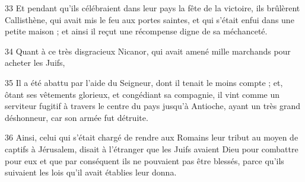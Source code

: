 \par 33 Et pendant qu'ils célébraient dans leur pays la fête de la victoire, ils brûlèrent Callisthène, qui avait mis le feu aux portes saintes, et qui s'était enfui dans une petite maison ; et ainsi il reçut une récompense digne de sa méchanceté.
\par 34 Quant à ce très disgracieux Nicanor, qui avait amené mille marchands pour acheter les Juifs,
\par 35 Il a été abattu par l'aide du Seigneur, dont il tenait le moins compte ; et, ôtant ses vêtements glorieux, et congédiant sa compagnie, il vint comme un serviteur fugitif à travers le centre du pays jusqu'à Antioche, ayant un très grand déshonneur, car son armée fut détruite.
\par 36 Ainsi, celui qui s'était chargé de rendre aux Romains leur tribut au moyen de captifs à Jérusalem, disait à l'étranger que les Juifs avaient Dieu pour combattre pour eux et que par conséquent ils ne pouvaient pas être blessés, parce qu'ils suivaient les lois qu'il avait établies leur donna.



